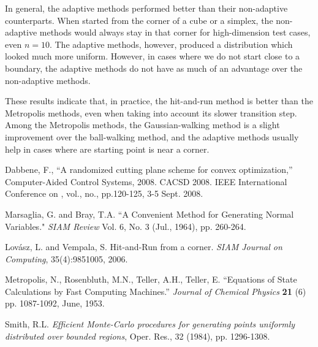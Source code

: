 \documentclass[11pt]{article}
\begin{document}
In general, the adaptive methods performed better than their non-adaptive counterparts. When started from the corner of a cube or a simplex, the non-adaptive methods would always stay in that corner for high-dimension test cases, even $n=10$. The adaptive methods, however, produced a distribution which looked much more uniform. However, in cases where we do not start close to a boundary, the adaptive methods do not have as much of an advantage over the non-adaptive methods.

These results indicate that, in practice, the hit-and-run method is better than the Metropolis methods, even when taking into account its slower transition step. Among the Metropolis methods, the Gaussian-walking method is a slight improvement over the ball-walking method, and the adaptive methods usually help in cases where are starting point is near a corner.

\pagebreak

\begin{thebibliography}{9}

 Dabbene, F., ``A randomized cutting plane scheme for convex optimization,'' Computer-Aided Control Systems, 2008. CACSD 2008. IEEE International Conference on , vol., no., pp.120-125, 3-5 Sept. 2008.

 Marsaglia, G. and Bray, T.A. ``A Convenient Method for Generating Normal Variables." \emph{SIAM Review} Vol. 6, No. 3 (Jul., 1964), pp. 260-264.

 Lov\'asz, L. and Vempala, S. Hit-and-Run from a corner. \emph{SIAM Journal on Computing}, 35(4):9851005, 2006.

 Metropolis, N., Rosenbluth, M.N., Teller, A.H., Teller, E. ``Equations of State Calculations by Fast Computing Machines.'' \emph{Journal of Chemical Physics} \textbf{21} (6) pp. 1087-1092, June, 1953.

 Smith, R.L. \emph{Efficient Monte-Carlo procedures for generating points uniformly distributed over
bounded regions}, Oper. Res., 32 (1984), pp. 1296-1308.

\end{thebibliography}
\end{document}
